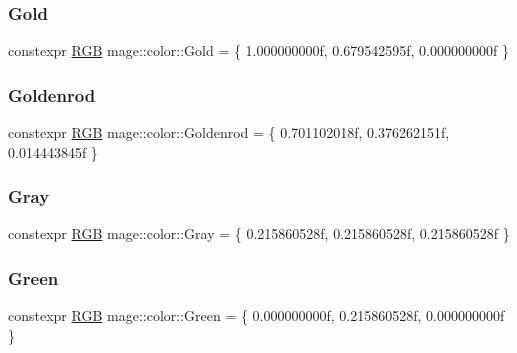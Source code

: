 \mbox{\label{namespacemage_1_1color_a72d35eacf778a3576ddb3d3c4d8930f0}} 
\subsubsection{\texorpdfstring{Gold}{Gold}}
{\footnotesize\ttfamily constexpr \mbox{\hyperlink{structmage_1_1_r_g_b}{R\+GB}} mage\+::color\+::\+Gold = \{ 1.\+000000000f, 0.\+679542595f, 0.\+000000000f \}}

\mbox{\label{namespacemage_1_1color_aebd4f6050ceb4c380fc13cc7d3302888}} 
\subsubsection{\texorpdfstring{Goldenrod}{Goldenrod}}
{\footnotesize\ttfamily constexpr \mbox{\hyperlink{structmage_1_1_r_g_b}{R\+GB}} mage\+::color\+::\+Goldenrod = \{ 0.\+701102018f, 0.\+376262151f, 0.\+014443845f \}}

\mbox{\label{namespacemage_1_1color_a43f3c4cf9713fb15ed89dec2c9d26556}} 
\subsubsection{\texorpdfstring{Gray}{Gray}}
{\footnotesize\ttfamily constexpr \mbox{\hyperlink{structmage_1_1_r_g_b}{R\+GB}} mage\+::color\+::\+Gray = \{ 0.\+215860528f, 0.\+215860528f, 0.\+215860528f \}}

\mbox{\label{namespacemage_1_1color_a063b467cc0e16aa4a291c38307a21bc0}} 
\subsubsection{\texorpdfstring{Green}{Green}}
{\footnotesize\ttfamily constexpr \mbox{\hyperlink{structmage_1_1_r_g_b}{R\+GB}} mage\+::color\+::\+Green = \{ 0.\+000000000f, 0.\+215860528f, 0.\+000000000f \}}

